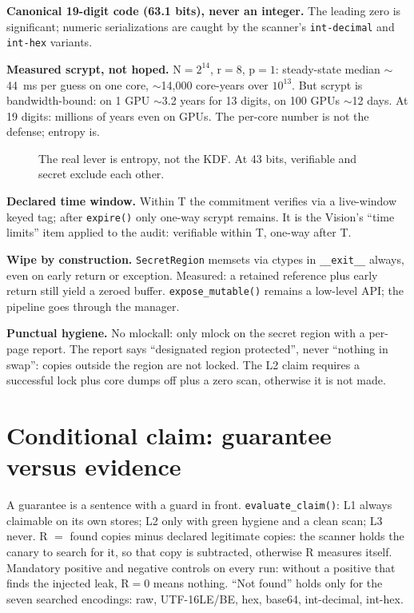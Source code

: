 \documentclass[11pt,a4paper]{article}
\begin{document}
\textbf{Canonical 19-digit code (63.1 bits), never an integer.} The leading zero is
significant; numeric serializations are caught by the scanner's \texttt{int-decimal}
and \texttt{int-hex} variants.

\textbf{Measured scrypt, not hoped.} N$=2^{14}$, r$=8$, p$=1$: steady-state median
$\sim$44~ms per guess on one core, $\sim$14,000 core-years over $10^{13}$.
But scrypt is bandwidth-bound: on 1 GPU $\sim$3.2 years for 13 digits, on 100 GPUs
$\sim$12 days. At 19 digits: millions of years even on GPUs. The per-core number is
not the defense; entropy is.

\begin{figure}[h]
\centering
{}
\caption{The real lever is entropy, not the KDF. At 43 bits, verifiable and secret exclude each other.}
\end{figure}

\textbf{Declared time window.} Within T the commitment verifies via a live-window
keyed tag; after \texttt{expire()} only one-way scrypt remains. It is the Vision's
``time limits'' item applied to the audit: verifiable within T, one-way after T.

\textbf{Wipe by construction.} \texttt{SecretRegion} memsets via ctypes in
\texttt{\_\_exit\_\_} always, even on early return or exception. Measured: a retained
reference plus early return still yield a zeroed buffer. \texttt{expose\_mutable()}
remains a low-level API; the pipeline goes through the manager.

\textbf{Punctual hygiene.} No mlockall: only mlock on the secret region with a
per-page report. The report says ``designated region protected'', never ``nothing
in swap'': copies outside the region are not locked. The L2 claim requires a
successful lock plus core dumps off plus a zero scan, otherwise it is not made.

\section{Conditional claim: guarantee versus evidence}
A guarantee is a sentence with a guard in front. \texttt{evaluate\_claim()}:
L1 always claimable on its own stores; L2 only with green hygiene and a clean scan;
L3 never. R $=$ found copies minus declared legitimate copies: the scanner holds
the canary to search for it, so that copy is subtracted, otherwise R measures itself.
Mandatory positive and negative controls on every run: without a positive that finds
the injected leak, R$=$0 means nothing. ``Not found'' holds only for the seven
searched encodings: raw, UTF-16LE/BE, hex, base64, int-decimal, int-hex.
\end{document}
